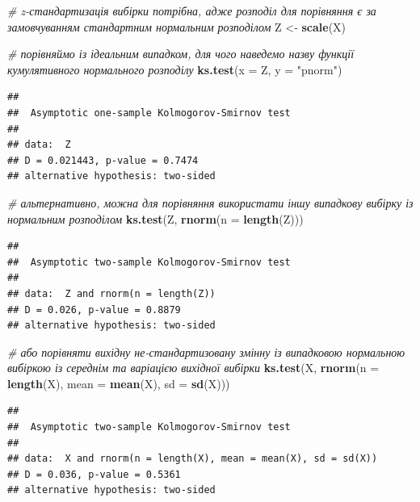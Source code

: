 \documentclass[
  11pt,
]{book}
\newenvironment{Shaded}{\begin{snugshade}}{\end{snugshade}}
\newcommand{\AttributeTok}[1]{\textcolor[rgb]{0.13,0.29,0.53}{#1}}
\newcommand{\CommentTok}[1]{\textcolor[rgb]{0.56,0.35,0.01}{\textit{#1}}}
\newcommand{\FunctionTok}[1]{\textcolor[rgb]{0.13,0.29,0.53}{\textbf{#1}}}
\newcommand{\NormalTok}[1]{#1}
\newcommand{\OtherTok}[1]{\textcolor[rgb]{0.56,0.35,0.01}{#1}}
\newcommand{\StringTok}[1]{\textcolor[rgb]{0.31,0.60,0.02}{#1}}
\begin{document}
\begin{Shaded}
\begin{Highlighting}[]
\CommentTok{\# z{-}стандартизація вибірки потрібна, адже розподіл для порівняння є за замовчуванням стандартним нормальним розподілом}
\NormalTok{Z }\OtherTok{\textless{}{-}} \FunctionTok{scale}\NormalTok{(X)}

\CommentTok{\# порівняймо із ідеальним випадком, для чого наведемо назву функції кумулятивного нормального розподілу}
\FunctionTok{ks.test}\NormalTok{(}\AttributeTok{x =}\NormalTok{ Z, }\AttributeTok{y =} \StringTok{"pnorm"}\NormalTok{)}
\end{Highlighting}
\end{Shaded}

\begin{verbatim}
## 
##  Asymptotic one-sample Kolmogorov-Smirnov test
## 
## data:  Z
## D = 0.021443, p-value = 0.7474
## alternative hypothesis: two-sided
\end{verbatim}

\begin{Shaded}
\begin{Highlighting}[]
\CommentTok{\# альтернативно, можна для порівняння використати іншу випадкову вибірку із нормальним розподілом}
\FunctionTok{ks.test}\NormalTok{(Z, }\FunctionTok{rnorm}\NormalTok{(}\AttributeTok{n =} \FunctionTok{length}\NormalTok{(Z)))}
\end{Highlighting}
\end{Shaded}

\begin{verbatim}
## 
##  Asymptotic two-sample Kolmogorov-Smirnov test
## 
## data:  Z and rnorm(n = length(Z))
## D = 0.026, p-value = 0.8879
## alternative hypothesis: two-sided
\end{verbatim}

\begin{Shaded}
\begin{Highlighting}[]
\CommentTok{\# або порівняти вихідну не{-}стандартизовану змінну із випадковою нормальною вибіркою із середнім та варіацією вихідної вибірки}
\FunctionTok{ks.test}\NormalTok{(X, }\FunctionTok{rnorm}\NormalTok{(}\AttributeTok{n =} \FunctionTok{length}\NormalTok{(X), }\AttributeTok{mean =} \FunctionTok{mean}\NormalTok{(X), }\AttributeTok{sd =} \FunctionTok{sd}\NormalTok{(X)))}
\end{Highlighting}
\end{Shaded}

\begin{verbatim}
## 
##  Asymptotic two-sample Kolmogorov-Smirnov test
## 
## data:  X and rnorm(n = length(X), mean = mean(X), sd = sd(X))
## D = 0.036, p-value = 0.5361
## alternative hypothesis: two-sided
\end{verbatim}
\end{document}
